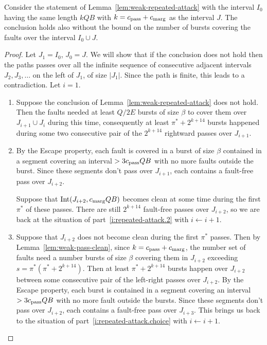 \documentclass[11pt]{memoir}
\theoremstyle{definition} %
\def\B{B}
\newcommand{\E}{E} %
\newcommand{\Int}{\mathrm{Int}} %
\newcommand{\passno}{\pi}
\newcommand{\Q}{Q} %
\newcommand{\s}{s} %
\newcommand{\cns}[1]{c_{\textrm{\upshape #1}}}
\newcommand{\CMarg}{\cns{marg}}
\newcommand{\CPass}{\cns{pass}}
\begin{document}
\begin{lemma}\label{lem:repeated-attack}
  Consider the statement of Lemma~\ref{lem:weak-repeated-attack} with the interval
  \( I_{0} \) having the same length \( k\Q\B \) with \( k=\CPass+\CMarg \) as the interval \( J \).
  The conclusion holds also
  without the bound on the number of bursts covering the faults over the interval  \( I_{0}\cup J \).
\end{lemma}
\begin{proof}
  Let \( J_{1}= I_{0} \), \( J_{0}=J \).
    We will show that if the conclusion does not hold then the paths passes over all the
  infinite sequence of consecutive adjacent intervals  \( J_{2},J_{3},\dots \) 
  on the left of \( J_{1} \), of size \( |J_{1}| \).
  Since the path is finite, this leads to a contradiction.
  Let \( i=1 \).
 \begin{enumerate}
 \item\label{i:repeated-attack.2}
   Suppose the conclusion of  Lemma~\ref{lem:weak-repeated-attack} does not hold.
   Then the faults needed at least \( \Q/2\E  \) bursts of size \( \beta \) to cover them
   over \( J_{i+1}\cup J_{i} \) during this time,
   consequently at least \( \passno^{*}+2^{k+14} \) bursts happened during
   some two consecutive pair of the  \( 2^{k+14} \) rightward passes over \( J_{i+1} \).

\item\label{i:repeated-attack.choice}
  By the Escape property, each fault is covered in a burst of size \( \beta \)
  contained in a segment covering an interval \( >3\CPass\Q\B \)
  with no more faults outside the burst.
  Since these segments don't pass over \( J_{i+1} \),  each contains a fault-free pass over \( J_{i+2} \).
  
  Suppose that \( \Int(J_{i+2},\CMarg\Q\B) \) becomes clean
  at some time during the first \( \passno^{*} \) of these passes.
  There are still \( 2^{k+14} \) fault-free passes over \( J_{i+2} \), so we are
  back at the situation of part~\ref{i:repeated-attack.2} with \( i\gets i+1 \).


    \item\label{i:repeated-attack.1}
      Suppose that \( J_{i+2} \) does not become clean during the first \( \passno^{*} \) passes.
      Then by Lemma~\ref{lem:weak-pass-clean}, since \( k=\CPass+\CMarg \), 
      the number set of faults need a number bursts of size \( \beta \) covering
      them in \( J_{i+2} \) exceeding  \( \s = \passno^{*}(\passno^{*}+2^{k+14}) \).
      Then at least \( \passno^{*}+2^{k+14} \) bursts happen over \( J_{i+2} \)
      between some consecutive pair of the left-right passes over \( J_{i+2} \).
  By the Escape property, each burst is contained in a segment
  covering an interval \( >3\CPass\Q\B \) with no more fault outside the bursts.
  Since these segments don't pass over \( J_{i+2} \),
  each contains a fault-free pass over \( J_{i+3} \).
  This brings us back to the situation of part~\ref{i:repeated-attack.choice} with \( i\gets i+1 \).
\end{enumerate}
\end{proof}
\end{document}
